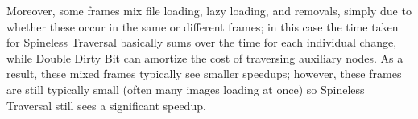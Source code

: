 Moreover, some frames mix file loading, lazy loading, and removals,
  simply due to whether these occur in the same or different frames;
  in this case the time taken for Spineless Traversal 
  basically sums over the time for each individual change,
  while Double Dirty Bit can amortize the cost
  of traversing auxiliary nodes.
As a result, these mixed frames typically see smaller speedups;
  however, these frames are still typically small
  (often many images loading at once)
  so Spineless Traversal still sees a significant speedup.
